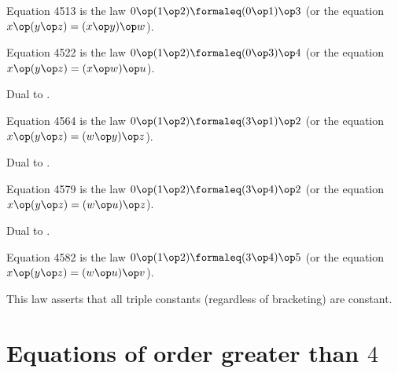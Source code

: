 \begin{definition}[Equation 4513]\label{eq4513}\leanok{}  Equation 4513 is the law $0 \op (1 \op 2)  \formaleq  (0 \op 1) \op 3$ (or the equation $x \op (y \op z) = (x \op y) \op w$).
\end{definition}

\begin{definition}[Equation 4522]\label{eq4522}\leanok{}  Equation 4522 is the law $0 \op (1 \op 2)  \formaleq  (0 \op 3) \op 4$ (or the equation $x \op (y \op z) = (x \op w) \op u$).
\end{definition}

Dual to .

\begin{definition}[Equation 4564]\label{eq4564}\leanok{}  Equation 4564 is the law $0 \op (1 \op 2)  \formaleq  (3 \op 1) \op 2$ (or the equation $x \op (y \op z) = (w \op y) \op z$).
\end{definition}

Dual to .

\begin{definition}[Equation 4579]\label{eq4579}\leanok{}  Equation 4579 is the law $0 \op (1 \op 2)  \formaleq  (3 \op 4) \op 2$ (or the equation $x \op (y \op z) = (w \op u) \op z$).
\end{definition}

Dual to .

\begin{definition}[Equation 4582]\label{eq4582}\leanok{}  Equation 4582 is the law $0 \op (1 \op 2)  \formaleq  (3 \op 4) \op 5$ (or the equation $x \op (y \op z) = (w \op u) \op v$).
\end{definition}

This law asserts that all triple constants (regardless of bracketing) are constant.

\section{Equations of order greater than \texorpdfstring{$4$}{4}}

